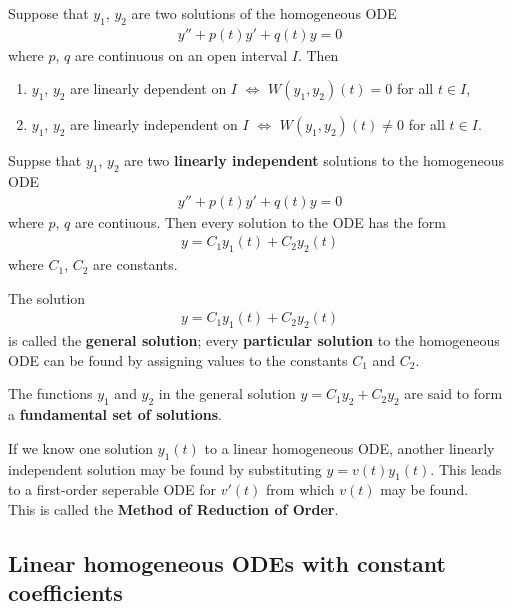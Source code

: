 \documentclass{article}
\begin{document}
\begin{theorem}
	Suppose that $y_1$, $y_2$ are two solutions of the homogeneous ODE
	\begin{align*}
		y''+p(t)y'+q(t)y =0
	\end{align*}
	where $p$, $q$ are continuous on an open interval $I$. Then
	\begin{enumerate}
		\item $y_1$, $y_2$ are linearly dependent on $I$ $\Leftrightarrow$ $W(y_1,y_2)(t)=0$ for all $t\in I$,
		\item $y_1$, $y_2$ are linearly independent on $I$ $\Leftrightarrow$ $W(y_1,y_2)(t)\not=0$ for all $t\in I$.
	\end{enumerate}
\end{theorem}
\begin{theorem}
	Suppse that $y_1$, $y_2$ are two \textbf{linearly independent} solutions to the
	homogeneous ODE
	\begin{align*}
		y''+p(t)y'+q(t)y =0
	\end{align*}
	where $p$, $q$ are contiuous. Then every solution to the ODE has the
	form
	\begin{align*}
		y = C_1y_1(t)+C_2y_2(t)
	\end{align*}
	where $C_1$, $C_2$ are constants.
\end{theorem}
\begin{definition}
	The solution
	\begin{align*}
		y=C_1y_1(t)+C_2y_2(t)
	\end{align*}
	is called the \textbf{general solution}; every \textbf{particular solution}
	to the homogeneous ODE can be found by assigning values to the
	constants $C_1$ and $C_2$.
\end{definition}
\begin{definition}
	The functions $y_1$ and $y_2$ in the general solution $y=C_1y_2+C_2y_2$
	are said to form a \textbf{fundamental set of solutions}.
\end{definition}
\begin{lemma}
	If we know one solution $y_1(t)$ to a linear homogeneous ODE, another
	linearly independent solution may be found by substituting $y=v(t)y_1(t)$.
	This leads to a first-order seperable ODE for $v'(t)$ from which
	$v(t)$ may be found.\\
	This is called the \textbf{Method of Reduction of Order}.
\end{lemma}


\subsection{Linear homogeneous ODEs with constant coefficients}
\end{document}
